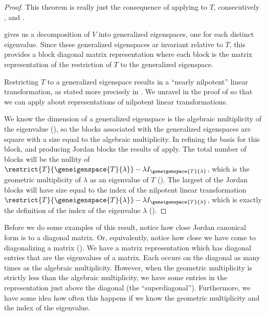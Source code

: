 \begin{proof}
This theorem is really just the consequence of applying to $T$, consecutively ,  and .\par
%
 gives us a decomposition of $V$ into generalized eigenspaces, one for each distinct eigenvalue.  Since these generalized eigenspaces ar invariant relative to $T$, this provides a block diagonal matrix representation where each block is the matrix representation of the restriction of $T$ to the generalized eigenspace.\par
%
Restricting $T$ to a generalized eigenspace results in a ``nearly nilpotent'' linear transformation, as stated more precisely in .  We unravel  in the proof of  so that we can apply  about representations of nilpotent linear transformations.\par
%
We know the dimension of a generalized eigenspace is the algebraic multiplicity of the eigenvalue (), so the blocks associated with the generalized eigenspaces are square with a size equal to the algebraic multiplicity.  In refining the basis for this block, and producing Jordan blocks the results of  apply.  The total number of blocks will be the nullity of $\restrict{T}{\geneigenspace{T}{\lambda}}-\lambda I_{\geneigenspace{T}{\lambda}}$, which is the geometric multiplicity of $\lambda$ as an eigenvalue of $T$ ().  The largest of the Jordan blocks will have size equal to the index of the nilpotent linear transformation $\restrict{T}{\geneigenspace{T}{\lambda}}-\lambda I_{\geneigenspace{T}{\lambda}}$, which is exactly the definition of the index of the eigenvalue $\lambda$ ().
%
\end{proof}
%
Before we do some examples of this result, notice how close Jordan canonical form is to a diagonal matrix.  Or, equivalently, notice how close we have come to diagonalizing a matrix ().  We have a matrix representation which has diagonal entries that are the eigenvalues of a matrix.  Each occurs on the diagonal as many times as the algebraic multiplicity.  However, when the geometric multiplicity is strictly less than the algebraic multiplicity, we have some entries in the representation just above the diagonal (the ``superdiagonal'').  Furthermore, we have some idea how often this happens if we know the geometric multiplicity and the index of the eigenvalue.\par
